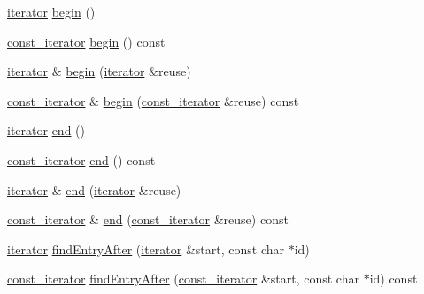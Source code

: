 \begin{CompactItemize}
\hyperlink{classWombat_1_1MamdaOrderBookPriceLevel_1_1iterator}{iterator} \hyperlink{classWombat_1_1MamdaOrderBookPriceLevel_bb494982acb64bc69a989077fb00a190}{begin} ()
\item 
\hyperlink{classWombat_1_1MamdaOrderBookPriceLevel_1_1iterator}{const\_\-iterator} \hyperlink{classWombat_1_1MamdaOrderBookPriceLevel_df499376eb089c8299e71d5891f1e36d}{begin} () const 
\item 
\hyperlink{classWombat_1_1MamdaOrderBookPriceLevel_1_1iterator}{iterator} \& \hyperlink{classWombat_1_1MamdaOrderBookPriceLevel_ca14cc630063e838ae624687290f0545}{begin} (\hyperlink{classWombat_1_1MamdaOrderBookPriceLevel_1_1iterator}{iterator} \&reuse)
\item 
\hyperlink{classWombat_1_1MamdaOrderBookPriceLevel_1_1iterator}{const\_\-iterator} \& \hyperlink{classWombat_1_1MamdaOrderBookPriceLevel_4a6b769b148fb84be0adb7df1d648ae0}{begin} (\hyperlink{classWombat_1_1MamdaOrderBookPriceLevel_1_1iterator}{const\_\-iterator} \&reuse) const 
\item 
\hyperlink{classWombat_1_1MamdaOrderBookPriceLevel_1_1iterator}{iterator} \hyperlink{classWombat_1_1MamdaOrderBookPriceLevel_15ad44839601a608e3e2765ea30b8331}{end} ()
\item 
\hyperlink{classWombat_1_1MamdaOrderBookPriceLevel_1_1iterator}{const\_\-iterator} \hyperlink{classWombat_1_1MamdaOrderBookPriceLevel_b3a9b7653c7bfa13a15d9418f0504605}{end} () const 
\item 
\hyperlink{classWombat_1_1MamdaOrderBookPriceLevel_1_1iterator}{iterator} \& \hyperlink{classWombat_1_1MamdaOrderBookPriceLevel_fad24ca9bf0418857ab41dbf4b62b2cc}{end} (\hyperlink{classWombat_1_1MamdaOrderBookPriceLevel_1_1iterator}{iterator} \&reuse)
\item 
\hyperlink{classWombat_1_1MamdaOrderBookPriceLevel_1_1iterator}{const\_\-iterator} \& \hyperlink{classWombat_1_1MamdaOrderBookPriceLevel_676459401e5e1527188cfbd9a1a6960f}{end} (\hyperlink{classWombat_1_1MamdaOrderBookPriceLevel_1_1iterator}{const\_\-iterator} \&reuse) const 
\item 
\hyperlink{classWombat_1_1MamdaOrderBookPriceLevel_1_1iterator}{iterator} \hyperlink{classWombat_1_1MamdaOrderBookPriceLevel_b873e17094774419280b582b19c81b6d}{find\-Entry\-After} (\hyperlink{classWombat_1_1MamdaOrderBookPriceLevel_1_1iterator}{iterator} \&start, const char $\ast$id)
\item 
\hyperlink{classWombat_1_1MamdaOrderBookPriceLevel_1_1iterator}{const\_\-iterator} \hyperlink{classWombat_1_1MamdaOrderBookPriceLevel_48a485bf88deda10e9696a870147ec23}{find\-Entry\-After} (\hyperlink{classWombat_1_1MamdaOrderBookPriceLevel_1_1iterator}{const\_\-iterator} \&start, const char $\ast$id) const 
\end{CompactItemize}

